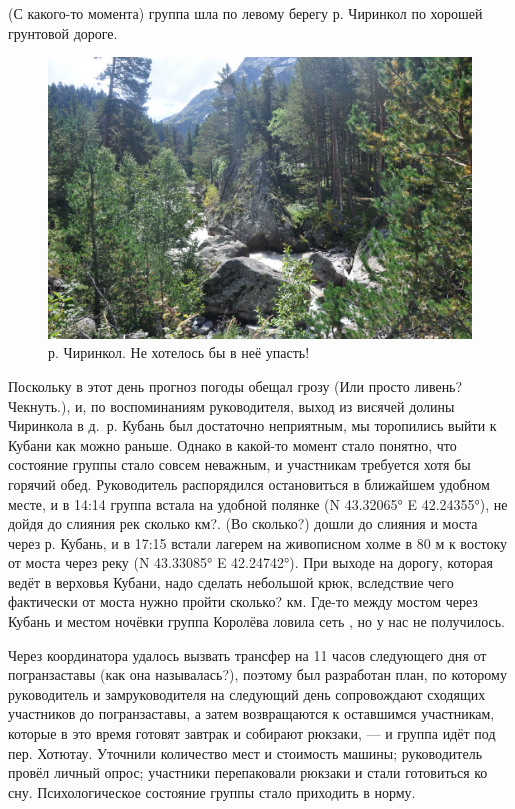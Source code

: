 \alert{(С какого-то момента)} группа шла по левому берегу р. Чиринкол по хорошей грунтовой дороге.
 
\begin{figure}[h!]
	\centering
	\includegraphics[width=0.7\linewidth]{../pics/DSC_0461 2}
	\caption{р. Чиринкол. Не хотелось бы в неё упасть!}
	\label{fig:DSC_0461}
\end{figure}

Поскольку в этот день прогноз погоды обещал грозу \alert{(Или просто ливень? Чекнуть.)}, и, по воспоминаниям руководителя, выход из висячей долины Чиринкола в д.~р. Кубань был достаточно неприятным, мы торопились выйти к Кубани как можно раньше. Однако в какой-то момент стало понятно, что состояние группы стало совсем неважным, и участникам требуется хотя бы горячий обед. Руководитель распорядился остановиться в ближайшем удобном месте, и в 14:14 группа встала на удобной полянке (N 43.32065° E 42.24355°), не дойдя до слияния рек \alert{сколько км?}. \alert{(Во сколько?)} дошли до слияния и моста через р. Кубань, и в 17:15 встали лагерем на живописном холме в 80 м к востоку от моста через реку (N 43.33085° E 42.24742°). При выходе на дорогу, которая ведёт в верховья Кубани, надо сделать небольшой крюк, вследствие чего фактически от моста нужно пройти \alert{сколько?} км.  Где-то между мостом через Кубань и местом ночёвки группа Королёва ловила сеть \cite{Korolyov2018}, но у нас не получилось. 

Через координатора удалось вызвать трансфер на 11 часов следующего дня от погранзаставы \alert{(как она называлась?)}, поэтому был разработан план, по которому руководитель и замруководителя на следующий день сопровождают сходящих участников до погранзаставы, а затем возвращаются к оставшимся участникам, которые в это время готовят завтрак и собирают рюкзаки, --- и группа идёт под пер. Хотютау. Уточнили количество мест и стоимость машины; руководитель провёл личный опрос; участники перепаковали рюкзаки и стали готовиться ко сну. Психологическое состояние группы стало приходить в норму.

\clearpage